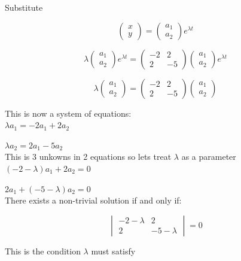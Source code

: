 \documentclass[12pt]{article}
\numberwithin{equation}{subsection}
\newcommand{\indd}{\hspace{2cm}}
\begin{document}
\indd Substitute 

$$ \begin{pmatrix}
x \\
y
\end{pmatrix}=\begin{pmatrix}
a_1 \\
a_2
\end{pmatrix}e^{\lambda t} $$

$$ \lambda \begin{pmatrix}
a_1 \\
a_2
\end{pmatrix}e^{\lambda t}= \begin{pmatrix}
-2 & 2 \\
2 & -5
\end{pmatrix} \begin{pmatrix}
a_1 \\
a_2
\end{pmatrix}e^{\lambda t}$$

$$ \lambda \begin{pmatrix}
a_1 \\
a_2
\end{pmatrix}= \begin{pmatrix}
-2 & 2 \\
2 & -5
\end{pmatrix} \begin{pmatrix}
a_1 \\
a_2
\end{pmatrix}$$

This is now a system of equations:\\

\indd $\lambda a_1 = -2a_1+2a_2$

\indd $\lambda a_2 = 2a_1-5a_2$\\

This is 3 unkowns in 2 equations so lets treat $\lambda$ as a parameter\\

\indd $ (-2-\lambda)a_1+2a_2=0$

\indd $ 2a_1+(-5-\lambda) a_2 =0$\\

There exists a non-trivial solution if and only if:

$$ \begin{vmatrix}
-2-\lambda & 2 \\
2 & -5-\lambda
\end{vmatrix} =0$$

This is the condition $\lambda$ must satisfy\\
\end{document}
